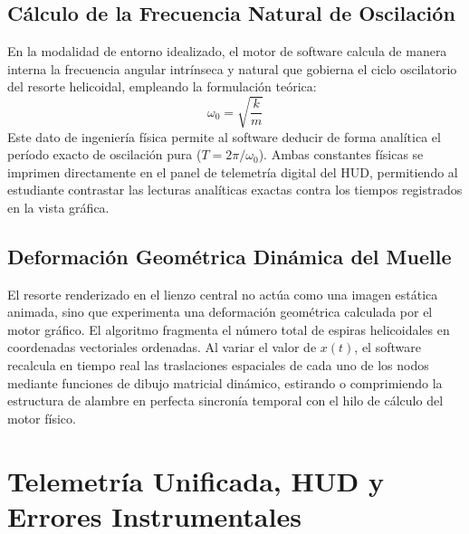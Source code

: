 \documentclass[11pt,a4paper]{article}
\begin{document}
	\subsection{Cálculo de la Frecuencia Natural de Oscilación}
	En la modalidad de entorno idealizado, el motor de software calcula de manera interna la frecuencia angular intrínseca y natural que gobierna el ciclo oscilatorio del resorte helicoidal, empleando la formulación teórica:
	\begin{equation}
		\omega_0 = \sqrt{\frac{k}{m}}
	\end{equation}
	Este dato de ingeniería física permite al software deducir de forma analítica el período exacto de oscilación pura ($T = 2\pi/\omega_0$). Ambas constantes físicas se imprimen directamente en el panel de telemetría digital del HUD, permitiendo al estudiante contrastar las lecturas analíticas exactas contra los tiempos registrados en la vista gráfica.
	
	\subsection{Deformación Geométrica Dinámica del Muelle}
	El resorte renderizado en el lienzo central no actúa como una imagen estática animada, sino que experimenta una deformación geométrica calculada por el motor gráfico. El algoritmo fragmenta el número total de espiras helicoidales en coordenadas vectoriales ordenadas. Al variar el valor de $x(t)$, el software recalcula en tiempo real las traslaciones espaciales de cada uno de los nodos mediante funciones de dibujo matricial dinámico, estirando o comprimiendo la estructura de alambre en perfecta sincronía temporal con el hilo de cálculo del motor físico.
	
	\section{Telemetría Unificada, HUD y Errores Instrumentales}
	
\end{document}
